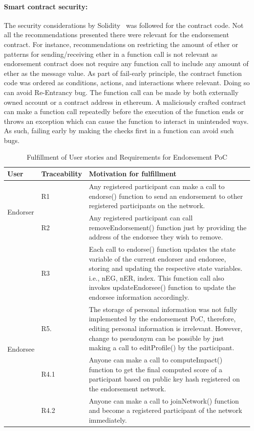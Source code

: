 \paragraph{Smart contract security:}The security considerations by
Solidity~\cite{soliditySecurity} was followed for the contract code. Not all
the recommendations presented there were relevant for the endorsement contract.
For instance, recommendations on restricting the amount of ether or patterns
for sending/receiving ether in a function call is not relevant as endorsement
contract does not require any function call to include any amount of ether as
the message value. As part of fail-early principle, the contract function code
was ordered as conditions, actions, and interactions where relevant. Doing so
can avoid Re-Entrancy bug. The function call can be made by both externally
owned account or a contract address in ethereum. A maliciously crafted contract
can make a function call repeatedly before the execution of the function ends
or throws an exception which can cause the function to interact in unintended
ways. As such, failing early by making the checks first in a function can avoid
such bugs. 
\begin{center} \label{table:fulfillment} 
	\begin{table}
		\begin{tabular} {| l | l | p{9cm} | }
		\hline
		\textbf{User}  & \textbf{Traceability}   & \textbf{Motivation for fulfillment} \\
		\hline
		\multirow{2}{*}{Endorser} & R1 & Any registered participant can make a
		call to endorse() function to send an endorsement to other registered
		participants on the network.      
		\\\cline{2-3} 
		& R2  & Any registered participant can call removeEndorsement()
		function just by providing the address of the endorsee they wish to
		remove.  \\\cline{2-3}
		& R3 & Each call to endorse() function updates the state variable of
		the current endorser and endorsee, storing and updating the respective
		state variables. i.e., nEG, nER, index. This function call also invokes
		updateEndorsee() function to update the endorsee information
		accordingly.  \\\cline{2-3}
		\hline
		\multirow{2}{*}{Endorsee} & R5.& The storage of personal information
		was not fully implemented by the endorsement PoC, therefore, editing
		personal information is irrelevant. However, change to pseudonym can be
		possible by just making a call to editProfile() by the participant.
		\\\cline{2-3}
		\hline
		\multirow{2}{*}{other users} & R4.1 & Anyone can make a call to
		computeImpact() function to get the final computed score of a
		participant based on public key hash registered on the endorsement
		network. \\\cline{2-3}
		& R4.2 &  Anyone can make a call to joinNetwork() function and become a
		registered participant of the network immediately.  \\\cline{2-3}
		\hline
	\end{tabular}
	\caption{Fulfillment of User stories and Requirements for Endorsement PoC}
\end{table}
\end{center}
